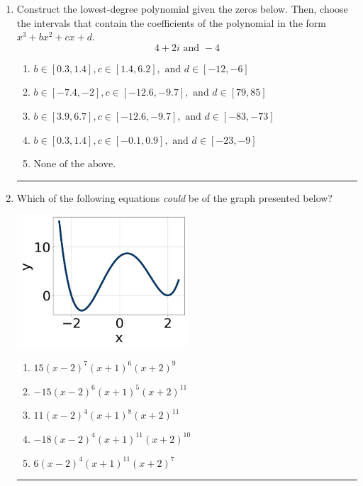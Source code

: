 \documentclass[14pt]{extbook}
\newcommand{\litem}[1]{\item#1\hspace*{-1cm}\rule{\textwidth}{0.4pt}}
\begin{document}
\begin{enumerate}
{\begin{enumerate}[label=\Alph*.]
\end{enumerate} }
\litem{
Construct the lowest-degree polynomial given the zeros below. Then, choose the intervals that contain the coefficients of the polynomial in the form $x^3+bx^2+cx+d$.\[ 4 + 2 i \text{ and } -4 \]\begin{enumerate}[label=\Alph*.]
\item \( b \in [0.3, 1.4], c \in [1.4, 6.2], \text{ and } d \in [-12, -6] \)
\item \( b \in [-7.4, -2], c \in [-12.6, -9.7], \text{ and } d \in [79, 85] \)
\item \( b \in [3.9, 6.7], c \in [-12.6, -9.7], \text{ and } d \in [-83, -73] \)
\item \( b \in [0.3, 1.4], c \in [-0.1, 0.9], \text{ and } d \in [-23, -9] \)
\item \( \text{None of the above.} \)

\end{enumerate} }
\litem{
Which of the following equations \textit{could} be of the graph presented below?
\begin{center}
    \includegraphics[width=0.5\textwidth]{../Figures/polyGraphToFunctionCopyC.png}
\end{center}
\begin{enumerate}[label=\Alph*.]
\item \( 15(x - 2)^{7} (x + 1)^{6} (x + 2)^{9} \)
\item \( -15(x - 2)^{6} (x + 1)^{5} (x + 2)^{11} \)
\item \( 11(x - 2)^{4} (x + 1)^{8} (x + 2)^{11} \)
\item \( -18(x - 2)^{4} (x + 1)^{11} (x + 2)^{10} \)
\item \( 6(x - 2)^{4} (x + 1)^{11} (x + 2)^{7} \)


\end{enumerate}}
\end{enumerate}
\end{document}

